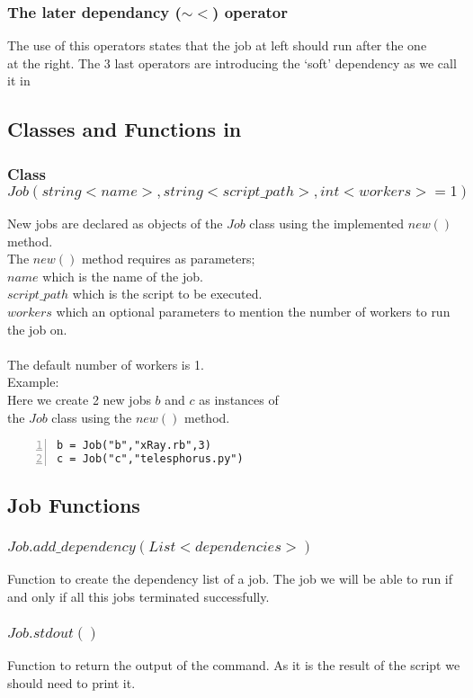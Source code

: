 \subsubsection*{The later dependancy ($\sim<$) operator}
The use of this operators states that the job at left should run after the one\\
at the right.
The 3 last operators are introducing the `soft' dependency as we call it in \lang{}\\
\subsection*{Classes and Functions in \lang{}}
\subsubsection*{Class $Job(string <name>, string <script\_path>, int <workers>=1)$}
New jobs are declared as objects of the $Job$ class using the implemented $new()$ method.\\
The $new()$ method requires as parameters;\\
$name$ which is the name of the job.\\
$script\_path$ which is the script to be executed.\\
$workers$ which an optional parameters to mention the number of workers to run the job on.\\\\
The default number of workers is 1.\\
Example:\\
Here we create 2 new jobs $b$ and $c$ as instances of \\the $Job$ class using the $new()$ method.
\begin{Verbatim}[numbers=left]
b = Job("b","xRay.rb",3)
c = Job("c","telesphorus.py")
\end{Verbatim}
\subsection*{Job Functions}
\subsubsection*{$Job.add\_dependency(List <dependencies>)$}
Function to create the dependency list of a job. The job we will be
able to run if and only if all this jobs terminated successfully.
\subsubsection*{$Job.stdout()$}
Function to return the output of the command. As it is the result of the script we should need to print it.
